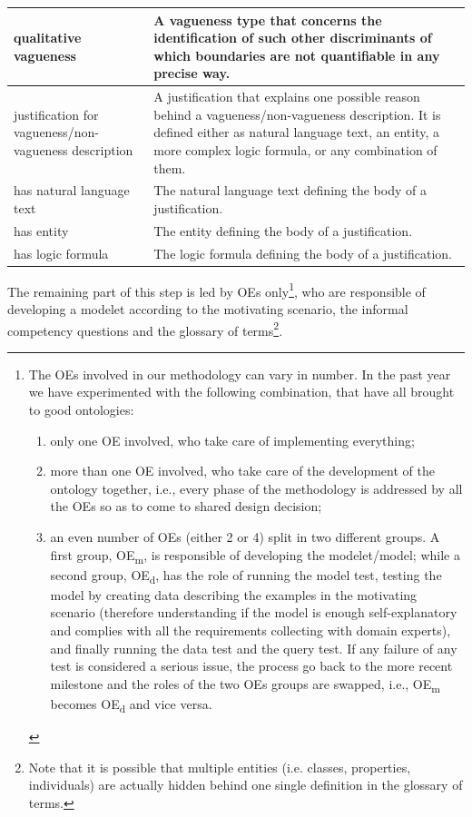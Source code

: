 \documentclass[runningheads,a4paper]{llncs}
\begin{document}
\begin{table}[h!]
{\begin{tabularx}{1.22\textwidth}{ >{\hsize}Y  >{\hsize}Y }
qualitative vagueness & A vagueness type that concerns the identification of such other discriminants of which boundaries are not quantifiable in any precise way. \\
 \midrule

justification for vagueness/non-vagueness description & A justification that explains one possible reason behind a vagueness/non-vagueness description. It is defined either as natural language text, an entity, a more complex logic formula, or any combination of them. \\
 \midrule

has natural language text & The natural language text defining the body of a justification. \\
 \midrule

has entity & The entity defining the body of a justification. \\
 \midrule

has logic formula & The logic formula defining the body of a justification. \\
 \bottomrule

\end{tabularx}}

\label{refTable2}
\end{table}


The remaining part of this step is led by OEs only\footnote{The OEs involved in our methodology can vary in number. In the past year we have experimented with the following combination, that have all brought to good ontologies: 
\begin{enumerate}
\item only one OE involved, who take care of implementing everything;
\item more than one OE involved, who take care of the development of the ontology together, i.e., every phase of the methodology is addressed by all the OEs so as to come to shared design decision;
\item an even number of OEs (either 2 or 4) split in two different groups. A first group, OE\textsubscript{m}, is responsible of developing the modelet/model; while a second group, OE\textsubscript{d}, has the role of running the model test, testing the model by creating data describing the examples in the motivating scenario (therefore understanding if the model is enough self-explanatory and complies with all the requirements collecting with domain experts), and finally running the data test and the query test. If any failure of any test is considered a serious issue, the process go back to the more recent milestone and the roles of the two OEs groups are swapped, i.e., OE\textsubscript{m} becomes OE\textsubscript{d} and vice versa.
\end{enumerate}}, who are responsible of developing a modelet according to the motivating scenario, the informal competency questions and the glossary of terms\footnote{Note that it is possible that multiple entities (i.e. classes, properties, individuals) are actually hidden behind one single definition in the glossary of terms.}.
\end{document}
